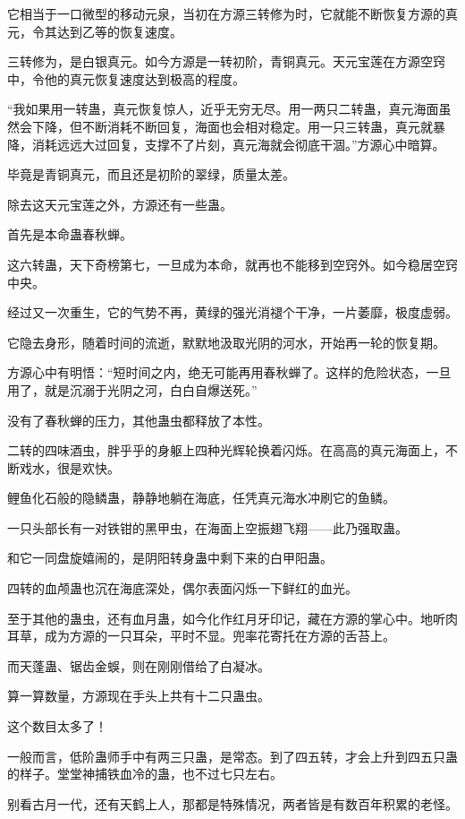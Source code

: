 \begin{this_body}
它相当于一口微型的移动元泉，当初在方源三转修为时，它就能不断恢复方源的真元，令其达到乙等的恢复速度。

三转修为，是白银真元。如今方源是一转初阶，青铜真元。天元宝莲在方源空窍中，令他的真元恢复速度达到极高的程度。

“我如果用一转蛊，真元恢复惊人，近乎无穷无尽。用一两只二转蛊，真元海面虽然会下降，但不断消耗不断回复，海面也会相对稳定。用一只三转蛊，真元就暴降，消耗远远大过回复，支撑不了片刻，真元海就会彻底干涸。”方源心中暗算。

毕竟是青铜真元，而且还是初阶的翠绿，质量太差。

除去这天元宝莲之外，方源还有一些蛊。

首先是本命蛊春秋蝉。

这六转蛊，天下奇榜第七，一旦成为本命，就再也不能移到空窍外。如今稳居空窍中央。

经过又一次重生，它的气势不再，黄绿的强光消褪个干净，一片萎靡，极度虚弱。

它隐去身形，随着时间的流逝，默默地汲取光阴的河水，开始再一轮的恢复期。

方源心中有明悟：“短时间之内，绝无可能再用春秋蝉了。这样的危险状态，一旦用了，就是沉溺于光阴之河，白白自爆送死。”

没有了春秋蝉的压力，其他蛊虫都释放了本性。

二转的四味酒虫，胖乎乎的身躯上四种光辉轮换着闪烁。在高高的真元海面上，不断戏水，很是欢快。

鲤鱼化石般的隐鳞蛊，静静地躺在海底，任凭真元海水冲刷它的鱼鳞。

一只头部长有一对铁钳的黑甲虫，在海面上空振翅飞翔——此乃强取蛊。

和它一同盘旋嬉闹的，是阴阳转身蛊中剩下来的白甲阳蛊。

四转的血颅蛊也沉在海底深处，偶尔表面闪烁一下鲜红的血光。

至于其他的蛊虫，还有血月蛊，如今化作红月牙印记，藏在方源的掌心中。地听肉耳草，成为方源的一只耳朵，平时不显。兜率花寄托在方源的舌苔上。

而天蓬蛊、锯齿金蜈，则在刚刚借给了白凝冰。

算一算数量，方源现在手头上共有十二只蛊虫。

这个数目太多了！

一般而言，低阶蛊师手中有两三只蛊，是常态。到了四五转，才会上升到四五只蛊的样子。堂堂神捕铁血冷的蛊，也不过七只左右。

别看古月一代，还有天鹤上人，那都是特殊情况，两者皆是有数百年积累的老怪。


\end{this_body}
